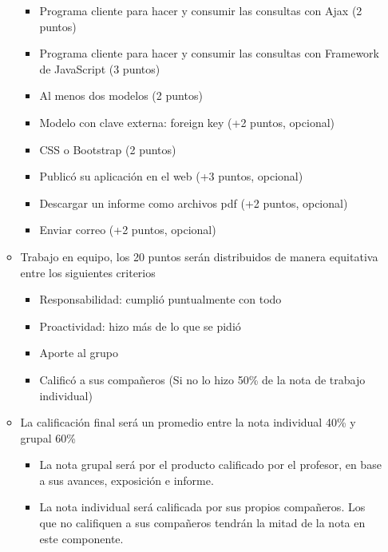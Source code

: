 \documentclass{article}
\begin{document}
\begin{itemize}
\begin{itemize}
\begin{itemize}
			            \item Programa cliente para hacer y consumir las consultas con Ajax (2 puntos)
			            \item Programa cliente para hacer y consumir las consultas con Framework de JavaScript (3 puntos)
			            \item Al menos dos modelos (2 puntos)
			            \item Modelo con clave externa: foreign key (+2 puntos, opcional)
			            \item CSS o Bootstrap (2 puntos)
			            \item Publicó su aplicación en el web (+3 puntos, opcional)
			            \item Descargar un informe como archivos pdf (+2 puntos, opcional)
			            \item Enviar correo (+2 puntos, opcional)
		            \end{itemize}
		      \item Trabajo en equipo, los 20 puntos serán distribuidos de manera equitativa entre los siguientes criterios
		            \begin{itemize}
			            \item Responsabilidad: cumplió puntualmente con todo
			            \item Proactividad: hizo más de lo que se pidió
			            \item Aporte al grupo
			            \item Calificó a sus compañeros (Si no lo hizo 50\% de la nota de trabajo individual)
		            \end{itemize}
		      \item La calificación final será un promedio entre la nota individual 40\% y grupal 60\%
		            \begin{itemize}
			            \item La nota grupal será por el producto calificado por el profesor, en base a sus avances, exposición e informe.
			            \item La nota individual será calificada por sus propios compañeros. Los que no califiquen a sus compañeros tendrán la mitad de la nota en este componente.
		            \end{itemize}
	      \end{itemize}
\end{itemize}
\pagebreak
\end{document}
